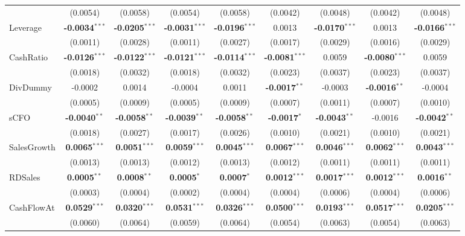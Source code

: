 \begin{landscape}
\begin{table}[H]
\begin{tabular}{lcccccccc}
 & (0.0054) & (0.0058) & (0.0054) & (0.0058) & (0.0042) & (0.0048) & (0.0042) & (0.0048) \\
Leverage & \textbf{-0.0034}$^{***}$ & \textbf{-0.0205}$^{***}$ & \textbf{-0.0031}$^{***}$ & \textbf{-0.0196}$^{***}$ & 0.0013 & \textbf{-0.0170}$^{***}$ & 0.0013 & \textbf{-0.0166}$^{***}$ \\
 & (0.0011) & (0.0028) & (0.0011) & (0.0027) & (0.0017) & (0.0029) & (0.0016) & (0.0029) \\
CashRatio & \textbf{-0.0126}$^{***}$ & \textbf{-0.0122}$^{***}$ & \textbf{-0.0121}$^{***}$ & \textbf{-0.0114}$^{***}$ & \textbf{-0.0081}$^{***}$ & 0.0059 & \textbf{-0.0080}$^{***}$ & 0.0059 \\
 & (0.0018) & (0.0032) & (0.0018) & (0.0032) & (0.0023) & (0.0037) & (0.0023) & (0.0037) \\
DivDummy & -0.0002 & 0.0014 & -0.0004 & 0.0011 & \textbf{-0.0017}$^{**}$ & -0.0003 & \textbf{-0.0016}$^{**}$ & -0.0004 \\
 & (0.0005) & (0.0009) & (0.0005) & (0.0009) & (0.0007) & (0.0011) & (0.0007) & (0.0010) \\
sCFO & \textbf{-0.0040}$^{**}$ & \textbf{-0.0058}$^{**}$ & \textbf{-0.0039}$^{**}$ & \textbf{-0.0058}$^{**}$ & \textbf{-0.0017}$^{*}$ & \textbf{-0.0043}$^{**}$ & -0.0016 & \textbf{-0.0042}$^{**}$ \\
 & (0.0018) & (0.0027) & (0.0017) & (0.0026) & (0.0010) & (0.0021) & (0.0010) & (0.0021) \\
SalesGrowth & \textbf{0.0065}$^{***}$ & \textbf{0.0051}$^{***}$ & \textbf{0.0059}$^{***}$ & \textbf{0.0045}$^{***}$ & \textbf{0.0067}$^{***}$ & \textbf{0.0046}$^{***}$ & \textbf{0.0062}$^{***}$ & \textbf{0.0043}$^{***}$ \\
 & (0.0013) & (0.0013) & (0.0012) & (0.0013) & (0.0012) & (0.0011) & (0.0011) & (0.0011) \\
RDSales & \textbf{0.0005}$^{**}$ & \textbf{0.0008}$^{**}$ & \textbf{0.0005}$^{*}$ & \textbf{0.0007}$^{*}$ & \textbf{0.0012}$^{***}$ & \textbf{0.0017}$^{***}$ & \textbf{0.0012}$^{***}$ & \textbf{0.0016}$^{**}$ \\
 & (0.0003) & (0.0004) & (0.0002) & (0.0004) & (0.0004) & (0.0006) & (0.0004) & (0.0006) \\
CashFlowAt & \textbf{0.0529}$^{***}$ & \textbf{0.0320}$^{***}$ & \textbf{0.0531}$^{***}$ & \textbf{0.0326}$^{***}$ & \textbf{0.0500}$^{***}$ & \textbf{0.0193}$^{***}$ & \textbf{0.0517}$^{***}$ & \textbf{0.0205}$^{***}$ \\
 & (0.0060) & (0.0064) & (0.0059) & (0.0064) & (0.0054) & (0.0063) & (0.0054) & (0.0063) \\

\end{tabular}
\end{table}
\end{landscape}

